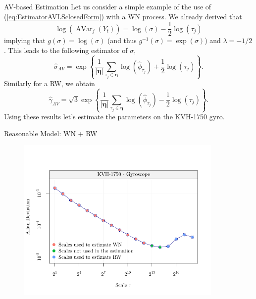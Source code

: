 \documentclass[envcountsect,usenames,dvipsnames]{beamer}
\DeclareMathOperator{\AV}{AVar}
\theoremstyle{mystyle}
\begin{document}
\begin{frame}{AV-based Estimation}
  \small 
    Let us consider a simple example of the use of (\ref{eq:EstimatorAVLSclosedForm}) with a WN process. We already derived that
    \begin{equation*}
       \log\left( \AV_j(Y_t)  \right) = \log \left(\sigma\right) - \frac{1}{2} \log (\tau_j)
    \end{equation*}
    implying that $g(\sigma) = \log(\sigma)$ (and thus $g^{-1}(\sigma) = \exp(\sigma)$) and $\lambda = -1/2$. This leads to the following estimator of $\sigma$,
    \begin{equation}
        \hat{\sigma}_{AV} = \exp\left\{ \frac{1}{| \bm{\eta}|} \sum_{\tau_j \in \bm{\eta}}  \log \left( \hat{\phi}_{\tau_j}  \right) + \frac{1}{2} \log \left( \tau_j \right) \right\}.
        \label{eq:estim:wn:av}
    \end{equation}
    Similarly for a RW, we obtain
    \begin{equation}
        \hat{\gamma}_{AV} = \sqrt{3} \exp\left\{ \frac{1}{| \bm{\eta}|} \sum_{\tau_j \in \bm{\eta}}  \log \left( \hat{\phi}_{\tau_j}  \right) - \frac{1}{2} \log \left( \tau_j \right) \right\}.
        \label{eq:estim:rw:av}
    \end{equation}
    Using these results let's estimate the parameters on the KVH-1750 gyro.
\end{frame}

\begin{frame}{Reasonable Model: WN + RW}
\vspace{-0.75cm}
    \begin{figure}
	    \centering
	  \includegraphics[width = 10cm]{Images/av_example_kvh_part2.pdf}
	\end{figure}
\end{frame}
\end{document}
